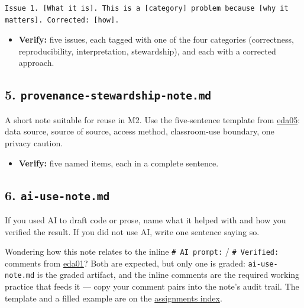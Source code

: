 \documentclass[
  letterpaper,
  DIV=11,
  numbers=noendperiod,
  oneside]{scrreprt}
\providecommand{\tightlist}{%
  \setlength{\itemsep}{0pt}\setlength{\parskip}{0pt}}
\begin{document}
\begin{verbatim}
Issue 1. [What it is]. This is a [category] problem because [why it matters]. Corrected: [how].
\end{verbatim}

\begin{itemize}
\tightlist
\item
  \textbf{Verify:} five issues, each tagged with one of the four
  categories (correctness, reproducibility, interpretation,
  stewardship), and each with a corrected approach.
\end{itemize}

\subsection*{\texorpdfstring{5.
\texttt{provenance-stewardship-note.md}}{5. provenance-stewardship-note.md}}\label{provenance-stewardship-note.md}

A short note suitable for reuse in M2. Use the five-sentence template
from \hyperref[four-audit-categories-for-ai-drafted-eda]{eda05}: data
source, source of source, access method, classroom-use boundary, one
privacy caution.

\begin{itemize}
\tightlist
\item
  \textbf{Verify:} five named items, each in a complete sentence.
\end{itemize}

\subsection*{\texorpdfstring{6.
\texttt{ai-use-note.md}}{6. ai-use-note.md}}\label{ai-use-note.md-1}

If you used AI to draft code or prose, name what it helped with and how
you verified the result. If you did not use AI, write one sentence
saying so.

Wondering how this note relates to the inline \texttt{\#\ AI\ prompt:} /
\texttt{\#\ Verified:} comments from
\hyperref[eda-as-evidence-stewardship]{eda01}? Both are expected, but
only one is graded: \texttt{ai-use-note.md} is the graded artifact, and
the inline comments are the required working practice that feeds it ---
copy your comment pairs into the note's audit trail. The template and a
filled example are on the
\hyperref[the-official-ai-documentation-rule]{assignments index}.
\end{document}
